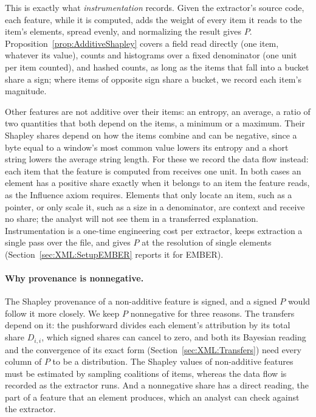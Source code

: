 This is exactly what \emph{instrumentation} records. Given the extractor's source code, each feature, while it is
computed, adds the weight of every item it reads to the item's elements, spread evenly, and normalizing the result gives
$P$. Proposition~\ref{prop:AdditiveShapley} covers a field read directly (one item, whatever its value), counts and
histograms over a fixed denominator (one unit per item counted), and hashed counts, as long as the items that fall into a
bucket share a sign; where items of opposite sign share a bucket, we record each item's magnitude.

Other features are not additive over their items: an entropy, an average, a ratio of two quantities that both depend on the items, a
minimum or a maximum. Their Shapley shares depend on how the items combine and can be negative, since a byte equal to a
window's most common value lowers its entropy and a short string lowers the average string length. For these we record
the data flow instead: each item that the feature is computed from receives one unit. In both cases an element has a
positive share exactly when it belongs to an item the feature reads, as the Influence axiom requires. Elements that
only locate an item, such as a pointer, or only scale it, such as a size in a denominator, are context and receive no
share; the analyst will not see them in a transferred explanation.
Instrumentation is a one-time engineering cost per extractor, keeps extraction a single pass over the file, and gives $P$ at
the resolution of single elements (Section~\ref{sec:XML:SetupEMBER} reports it for EMBER).

\paragraph{Why provenance is nonnegative.} The Shapley provenance of a non-additive feature is signed, and a signed $P$
would follow it more closely. We keep $P$ nonnegative for three reasons. The transfers depend on it: the pushforward
divides each element's attribution by its total share $D_{i,i}$, which signed shares can cancel to zero, and both its
Bayesian reading and the convergence of its exact form (Section~\ref{sec:XML:Transfers}) need every column of $P$ to be
a distribution. The Shapley values of non-additive features must be estimated by sampling coalitions of items, whereas
the data flow is recorded as the extractor runs. And a nonnegative share has a direct reading, the part of a feature
that an element produces, which an analyst can check against the extractor.

